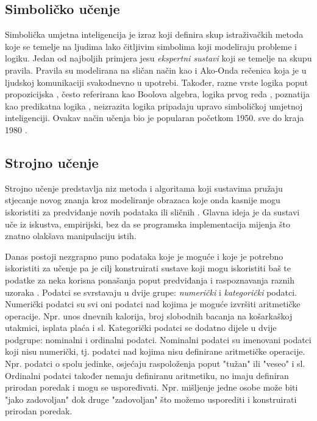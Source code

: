 \documentclass[times, utf8, zavrsni]{fer}
\begin{document}
\subsection{Simboličko učenje}
Simbolička umjetna inteligencija  je izraz koji definira skup istraživačkih metoda koje se temelje na ljudima lako čitljivim simbolima  koji modeliraju probleme i logiku. Jedan od najboljih primjera jesu \textit{ekspertni sustavi} koji se temelje na skupu pravila. Pravila su modelirana na sličan način kao i Ako-Onda rečenica  koja je u ljudskoj komunikaciji svakodnevno u upotrebi. Također, razne vrste logika poput propozicijska , često referirana kao Boolova algebra, logika prvog reda , poznatija kao predikatna logika , neizrazita logika  pripadaju upravo simboličkoj umjetnoj inteligenciji. Ovakav način učenja bio je popularan početkom 1950. sve do kraja 1980 \citep{wiki:SIMB}.

\subsection{Strojno učenje}
Strojno učenje  predstavlja niz metoda i algoritama koji sustavima pružaju stjecanje novog znanja kroz modeliranje obrazaca koje onda kasnije mogu iskoristiti za predviđanje novih podataka ili sličnih \citep{cupicML}. Glavna ideja je da sustavi uče iz iskustva, empirijski, bez da se programska implementacija mijenja što znatno olakšava manipulaciju istih.

Danas postoji nezgrapno puno podataka koje je moguće i koje je potrebno iskoristiti za učenje pa je cilj konstruirati sustave koji mogu iskoristiti baš te podatke za neka korisna ponašanja poput predviđanja i raspoznavanja raznih uzoraka \citep{cupicML}. Podatci se svrstavaju u dvije grupe: \textit{numerički} i \textit{kategorički} podatci. Numerički podatci su svi oni podatci nad kojima je moguće izvršiti aritmetičke operacije. Npr. unos dnevnih kalorija, broj slobodnih bacanja na košarkaškoj utakmici, isplata plaća i sl. Kategorički podatci se dodatno dijele u dvije podgrupe: nominalni i ordinalni podatci. Nominalni podatci su imenovani podatci koji nisu numerički, tj. podatci nad kojima nisu definirane aritmetičke operacije. Npr. podatci o spolu jedinke, osjećaju raspoloženja poput "tužan" ili "veseo" i sl. Ordinalni podatci također nemaju definiranu aritmetiku, no imaju definiran prirodan poredak i mogu se uspoređivati. Npr. mišljenje jedne osobe može biti "jako zadovoljan" dok druge "zadovoljan" što možemo usporediti i konstruirati prirodan poredak.
\end{document}
